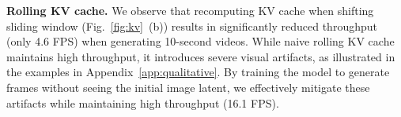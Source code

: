 \documentclass{article}
\begin{document}

\noindent\textbf{Rolling KV cache.} We observe that recomputing KV cache when shifting sliding window (Fig.~\ref{fig:kv}~(b)) results in significantly reduced throughput (only 4.6 FPS) when generating 10-second videos. While naive rolling KV cache maintains high throughput, it introduces severe visual artifacts, as illustrated in the examples in Appendix~\ref{app:qualitative}. By training the model to generate frames without seeing the initial image latent, we effectively mitigate these artifacts while maintaining high throughput (16.1 FPS).
\end{document}
